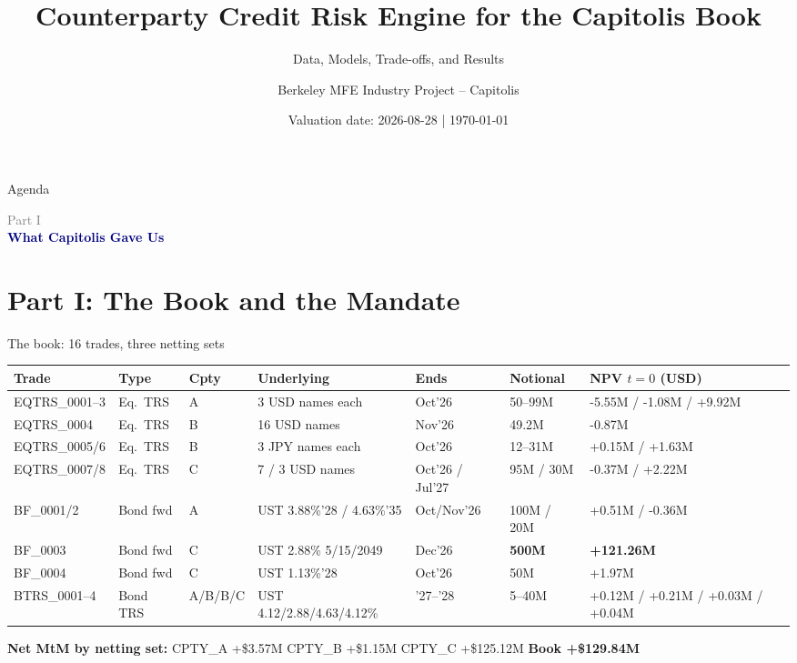 \documentclass[8pt,aspectratio=169]{beamer}
\title{\textbf{Counterparty Credit Risk Engine for the Capitolis Book}}
\subtitle{Data, Models, Trade-offs, and Results}
\author{Berkeley MFE Industry Project -- Capitolis}
\date{Valuation date: 2026-08-28 \quad | \quad \today}
\newcommand{\partframe}[2]{%
\begin{frame}
  \vspace{1.2cm}
  {\large\textcolor{grey}{Part #1}}\\[4pt]
  {\Large\textcolor{navy}{\textbf{#2}}}
\end{frame}}
\begin{document}
\begin{frame}
  \titlepage
\end{frame}

\begin{frame}{Agenda}
  \tableofcontents
\end{frame}

\partframe{I}{What Capitolis Gave Us}
\section{Part I: The Book and the Mandate}

\begin{frame}{The book: 16 trades, three netting sets}
  \scriptsize
  \begin{tabular}{p{}p{}p{}p{}p{}p{}p{}}
    \toprule
    \textbf{Trade} & \textbf{Type} & \textbf{Cpty} & \textbf{Underlying} & \textbf{Ends} & \textbf{Notional} & \textbf{NPV $t{=}0$ (USD)} \\
    \midrule
    EQTRS\_0001--3 & Eq.\ TRS & A & 3 USD names each & Oct'26 & 50--99M & -5.55M / -1.08M / +9.92M \\
    EQTRS\_0004 & Eq.\ TRS & B & 16 USD names & Nov'26 & 49.2M & -0.87M \\
    EQTRS\_0005/6 & Eq.\ TRS & B & 3 JPY names each & Oct'26 & 12--31M & +0.15M / +1.63M \\
    EQTRS\_0007/8 & Eq.\ TRS & C & 7 / 3 USD names & Oct'26 / Jul'27 & 95M / 30M & -0.37M / +2.22M \\
    BF\_0001/2 & Bond fwd & A & UST 3.88\%'28 / 4.63\%'35 & Oct/Nov'26 & 100M / 20M & +0.51M / -0.36M \\
    BF\_0003 & Bond fwd & C & UST 2.88\% 5/15/2049 & Dec'26 & \textbf{500M} & \textbf{+121.26M} \\
    BF\_0004 & Bond fwd & C & UST 1.13\%'28 & Oct'26 & 50M & +1.97M \\
    BTRS\_0001--4 & Bond TRS & A/B/B/C & UST 4.12/2.88/4.63/4.12\% & '27--'28 & 5--40M & +0.12M / +0.21M / +0.03M / +0.04M \\
    \bottomrule
  \end{tabular}

  \vspace{4pt}
  \textbf{Net MtM by netting set:} CPTY\_A +\$3.57M \quad CPTY\_B +\$1.15M \quad CPTY\_C +\$125.12M \quad \textbf{Book +\$129.84M}
\end{frame}
\end{document}
